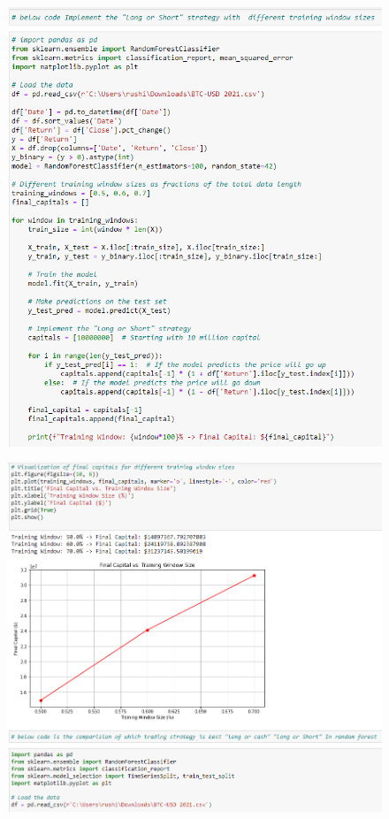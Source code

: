 \begin{figure}[H]
\centering
\includegraphics[scale=0.65]{fig23.jpg}
\end{figure}

\begin{figure}[H]
\centering
\includegraphics[scale=0.65]{fig24.jpg}
\end{figure}

